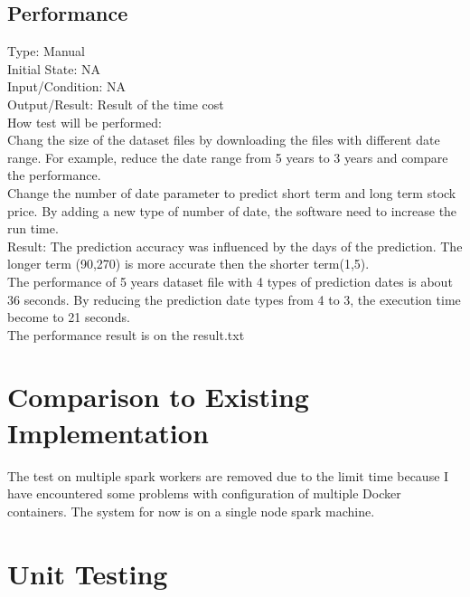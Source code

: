 \documentclass[12pt, titlepage]{article}
\begin{document}
\subsection{Performance}
Type: Manual\\
Initial State: NA\\
Input/Condition: NA\\
Output/Result: Result of the time cost\\
How test will be performed: \\
Chang the size of the dataset files by downloading the files with different date range. For example, reduce the date range from 5 years to 3 years and compare the performance. \\
Change the number of date parameter to predict short term and long term stock price. By adding a new type of number of date, the software need to increase the run time. \\
Result: The prediction accuracy was influenced by the days of the prediction. The longer term (90,270) is more accurate then the shorter term(1,5). \\ 
The performance of 5 years dataset file with 4 types of prediction dates is about 36 seconds. By reducing the prediction date types from 4 to 3, the execution time become to 21 seconds. \\
The performance result is on the result.txt
\section{Comparison to Existing Implementation} 

The test on multiple spark workers are removed due to the limit time because I have encountered some problems with configuration of multiple Docker containers. The system for now is on a single node spark machine.

\section{Unit Testing}
\end{document}
